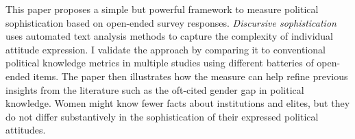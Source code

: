 This paper proposes a simple but powerful framework to measure political sophistication based on open-ended survey responses. \textit{Discursive sophistication} uses automated text analysis methods to capture the complexity of individual attitude expression. I validate the approach by comparing it to conventional political knowledge metrics in multiple studies using different batteries of open-ended items. The paper then illustrates how the measure can help refine previous insights from the literature such as the oft-cited gender gap in political knowledge. Women might know fewer facts about institutions and elites, but they do not differ substantively in the sophistication of their expressed political attitudes.